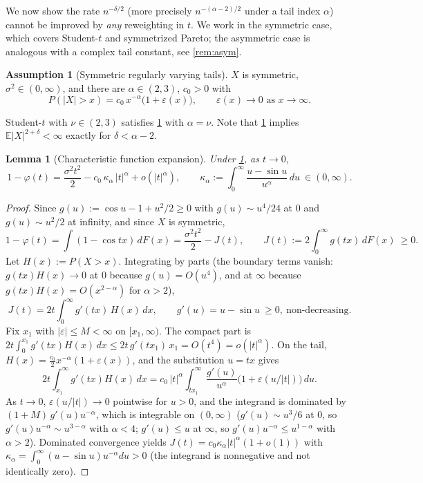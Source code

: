\documentclass[11pt,a4paper]{article}
\theoremstyle{plain}
\newtheorem{lemma}[theorem]{Lemma}
\theoremstyle{definition}
\newtheorem{assumption}[theorem]{Assumption}
\theoremstyle{remark}
\numberwithin{equation}{section}
\newcommand{\E}{\mathbb{E}}
\newcommand{\1}{\mathbbm{1}}
\begin{document}
We now show the rate $n^{-\delta/2}$ (more precisely $n^{-(\alpha-2)/2}$ under a tail
index $\alpha$) cannot be improved by \emph{any} reweighting in $t$. We work in the
symmetric case, which covers Student-$t$ and symmetrized Pareto; the asymmetric case is
analogous with a complex tail constant, see \cref{rem:asym}.

\begin{assumption}[Symmetric regularly varying tails]\label{ass:RV}
$X$ is symmetric, $\sigma^2\in(0,\infty)$, and there are $\alpha\in(2,3)$, $c_0>0$ with
\[
P(|X|>x)=c_0\,x^{-\alpha}\big(1+\varepsilon(x)\big),\qquad
\varepsilon(x)\to0 \text{ as } x\to\infty .
\]
\end{assumption}

Student-$t$ with $\nu\in(2,3)$ satisfies \cref{ass:RV} with $\alpha=\nu$. Note that
\cref{ass:RV} implies $\E|X|^{2+\delta}<\infty$ exactly for $\delta<\alpha-2$.

\begin{lemma}[Characteristic function expansion]\label{lem:cf}
Under \cref{ass:RV}, as $t\to0$,
\[
1-\varphi(t)=\frac{\sigma^2t^2}{2}-c_0\,\kappa_\alpha\,|t|^\alpha+o(|t|^\alpha),
\qquad
\kappa_\alpha:=\int_0^\infty \frac{u-\sin u}{u^{\alpha}}\,du\ \in(0,\infty).
\]
\end{lemma}

\begin{proof}
Since $g(u):=\cos u-1+u^2/2\ge0$ with $g(u)\sim u^4/24$ at $0$ and $g(u)\sim u^2/2$ at
infinity, and since $X$ is symmetric,
\[
1-\varphi(t)=\int(1-\cos tx)\,dF(x)
=\frac{\sigma^2t^2}{2}-J(t),\qquad
J(t):=2\int_0^\infty g(tx)\,dF(x)\ \ge0 .
\]
Let $H(x):=P(X>x)$. Integrating by parts (the boundary terms vanish: $g(tx)H(x)\to0$ at
$0$ because $g(u)=O(u^4)$, and at $\infty$ because $g(tx)H(x)=O(x^{2-\alpha})$ for
$\alpha>2$),
\[
J(t)=2t\int_0^\infty g'(tx)\,H(x)\,dx,\qquad g'(u)=u-\sin u\ \ge 0,\ \text{non-decreasing}.
\]
Fix $x_1$ with $|\varepsilon|\le M<\infty$ on $[x_1,\infty)$. The compact part is
$2t\int_0^{x_1}g'(tx)H(x)\,dx\le 2t\,g'(tx_1)\,x_1=O(t^4)=o(|t|^\alpha)$. On the tail,
$H(x)=\tfrac{c_0}{2}x^{-\alpha}(1+\varepsilon(x))$, and the substitution $u=tx$ gives
\[
2t\int_{x_1}^\infty g'(tx)H(x)\,dx
=c_0\,|t|^\alpha\int_{tx_1}^\infty \frac{g'(u)}{u^{\alpha}}
\big(1+\varepsilon(u/|t|)\big)\,du .
\]
As $t\to0$, $\varepsilon(u/|t|)\to0$ pointwise for $u>0$, and the integrand is
dominated by $(1+M)\,g'(u)u^{-\alpha}$, which is integrable on $(0,\infty)$
($g'(u)\sim u^3/6$ at $0$, so $g'(u)u^{-\alpha}\sim u^{3-\alpha}$ with $\alpha<4$;
$g'(u)\le u$ at $\infty$, so $g'(u)u^{-\alpha}\le u^{1-\alpha}$ with $\alpha>2$).
Dominated convergence yields $J(t)=c_0\kappa_\alpha|t|^\alpha(1+o(1))$ with
$\kappa_\alpha=\int_0^\infty(u-\sin u)u^{-\alpha}du>0$ (the integrand is nonnegative
and not identically zero).
\end{proof}
\end{document}
